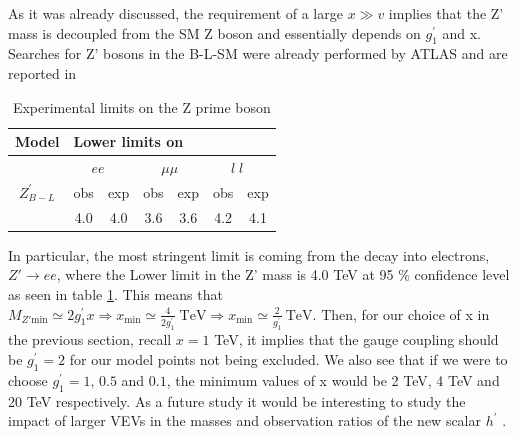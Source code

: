 \documentclass[12pt]{article}
\begin{document}

As it was already discussed, the requirement of a large $x \gg v$ implies that the Z' mass is decoupled from the SM Z boson and essentially depends on $g_1^\prime$ and x. Searches for Z' bosons in the B-L-SM were already performed by ATLAS and are reported in
\begin{table}[h]
\centering
\begin{tabular}{|c|c|c|c|c|c|c|}
\hline
Model                             & \multicolumn{6}{l|}{Lower limits on}                                                                           \\ \hline
\multirow{3}{*}{$Z^\prime_{B-L}$} & \multicolumn{2}{l|}{$ \quad \; ee$} & \multicolumn{2}{l|}{$\quad \; \mu \mu $} & \multicolumn{2}{l|}{$\quad \; l \; l$} \\ \cline{2-7} 
                                  & obs        & exp        & obs                          & exp                         & obs        & exp        \\ \cline{2-7} 
                                  & 4.0        & 4.0        & 3.6                          & 3.6                         & 4.2        & 4.1        \\ \hline
\end{tabular}
\caption{Experimental limits on the Z prime boson}
\label{shit}
\end{table}

In particular, the most stringent limit is coming from the decay into electrons, $Z' \rightarrow e e$, where the Lower limit in the Z' mass is 4.0 TeV at 95 \% confidence level as seen in table \ref{shit}. 
This means that 
$M_{Z' \text{min}} \simeq 2 g_1^\prime x \Rightarrow x_{\text{min}} \simeq  \frac{4}{ 2 g_1^\prime}  \; \text{TeV} \Rightarrow  x_{\text{min}} \simeq \frac{2}{g_1^\prime} \  \text{TeV}$.
Then, for our choice of x in the previous section, recall $x = 1$ TeV, it implies that the gauge coupling should be $g_1^\prime = 2$ for our model points not being excluded. We also see that if we were to choose $ g_1^\prime = 1$, $0.5$ and $0.1$, the minimum values of x would be 2 TeV, 4 TeV and 20 TeV respectively. As a future study it would be interesting to study the impact of larger VEVs in the masses and observation ratios of the new scalar $h^\prime$  \cite{Aaboud:2017buh}. 
\end{document}
